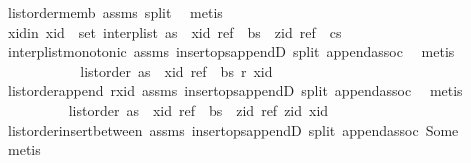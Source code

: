 \begin{isabellebody}
\ list{\isacharunderscore}order{\isacharunderscore}memb{}\ assms{\isacharparenleft}{}{\isacharparenright}\ split\ \isamarkupfalse%
\ metis\isanewline
\ \ \ \ \ \ \ \ \isamarkupfalse%
\ xid{\isacharunderscore}in{\isacharcolon}\ {\isachardoublequoteopen}xid\ {\isasymin}\ set\ {\isacharparenleft}interp{\isacharunderscore}list\ {\isacharparenleft}as\ {\isacharat}\ {\isacharbrackleft}{\isacharparenleft}xid{\isacharcomma}\ ref{\isacharparenright}{\isacharbrackright}\ {\isacharat}\ bs\ {\isacharat}\ {\isacharbrackleft}{\isacharparenleft}zid{\isacharcomma}\ ref{\isacharparenright}{\isacharbrackright}\ {\isacharat}\ cs{\isacharparenright}{\isacharparenright}{\isachardoublequoteclose}\isanewline
\ \ \ \ \ \ \ \ \ \ \isamarkupfalse%
\ interp{\isacharunderscore}list{\isacharunderscore}monotonic\ assms{\isacharparenleft}{}{\isacharparenright}\ insert{\isacharunderscore}ops{\isacharunderscore}appendD\ split\ append{\isachardot}assoc\ \isamarkupfalse%
\ metis\isanewline
\ \ \ \ \ \ \ \ \isamarkupfalse%
\ \isamarkupfalse%
\ {\isachardoublequoteopen}list{\isacharunderscore}order\ {\isacharparenleft}as\ {\isacharat}\ {\isacharbrackleft}{\isacharparenleft}xid{\isacharcomma}\ ref{\isacharparenright}{\isacharbrackright}\ {\isacharat}\ bs{\isacharparenright}\ r\ xid{\isachardoublequoteclose}\isanewline
\ \ \ \ \ \ \ \ \ \ \isamarkupfalse%
\ list{\isacharunderscore}order{\isacharunderscore}append\ r{\isacharunderscore}xid\ assms{\isacharparenleft}{}{\isacharparenright}\ insert{\isacharunderscore}ops{\isacharunderscore}appendD\ split\ append{\isachardot}assoc\ \isamarkupfalse%
\ metis\isanewline
\ \ \ \ \ \ \ \ \isamarkupfalse%
\ {\isachardoublequoteopen}list{\isacharunderscore}order\ {\isacharparenleft}as\ {\isacharat}\ {\isacharbrackleft}{\isacharparenleft}xid{\isacharcomma}\ ref{\isacharparenright}{\isacharbrackright}\ {\isacharat}\ bs\ {\isacharat}\ {\isacharbrackleft}{\isacharparenleft}zid{\isacharcomma}\ ref{\isacharparenright}{\isacharbrackright}{\isacharparenright}\ zid\ xid{\isachardoublequoteclose}\isanewline
\ \ \ \ \ \ \ \ \ \ \isamarkupfalse%
\ list{\isacharunderscore}order{\isacharunderscore}insert{\isacharunderscore}between\ assms{\isacharparenleft}{}{\isacharparenright}\ insert{\isacharunderscore}ops{\isacharunderscore}appendD\ split\ append{\isachardot}assoc\ Some\ \isamarkupfalse%
\ metis\isanewline
\ \ \ \ \ \ \ \ \isamarkupfalse%

\end{isabellebody}
